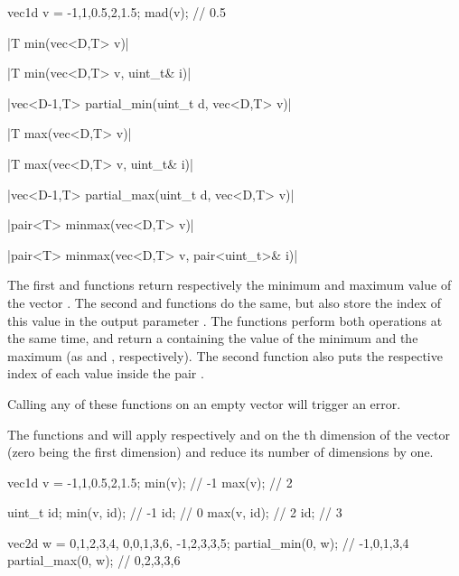 \begin{example}
\begin{cppcode}
vec1d v = {-1,1,0.5,2,1.5};
mad(v); // 0.5
\end{cppcode}
\end{example}

\funcitem \cppinline|T min(vec<D,T> v)| 

\cppinline|T min(vec<D,T> v, uint_t& i)|

\cppinline|vec<D-1,T> partial_min(uint_t d, vec<D,T> v)| 

\cppinline|T max(vec<D,T> v)| 

\cppinline|T max(vec<D,T> v, uint_t& i)|

\cppinline|vec<D-1,T> partial_max(uint_t d, vec<D,T> v)| 

\cppinline|pair<T> minmax(vec<D,T> v)| 

\cppinline|pair<T> minmax(vec<D,T> v, pair<uint_t>& i)|

The first  and  functions return respectively the minimum and maximum value of the vector . The second  and  functions do the same, but also store the index of this value in the output parameter . The  functions perform both operations at the same time, and return a  containing the value of the minimum and the maximum (as  and , respectively). The second  function also puts the respective index of each value inside the pair .

Calling any of these functions on an empty vector will trigger an error.

The functions  and  will apply respectively  and  on the th dimension of the vector (zero being the first dimension) and reduce its number of dimensions by one.

\begin{example}
\begin{cppcode}
vec1d v = {-1,1,0.5,2,1.5};
min(v); // -1
max(v); // 2

uint_t id;
min(v, id); // -1
id;         // 0
max(v, id); // 2
id;         // 3

vec2d w = {{0,1,2,3,4}, {0,0,1,3,6}, {-1,2,3,3,5}};
partial_min(0, w); // {-1,0,1,3,4}
partial_max(0, w); // {0,2,3,3,6}
\end{cppcode}
\end{example}

